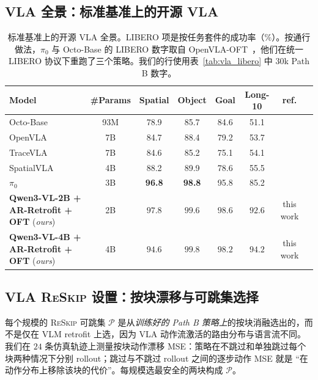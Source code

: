 \documentclass{article}
\newcommand{\reskip}{\textsc{ReSkip}}
\begin{document}
\subsection{VLA 全景：标准基准上的开源 VLA}
\label{app:vla_landscape}
\begin{table}[h]
\caption{标准基准上的开源 VLA 全景。LIBERO 项是按任务套件的成功率（$\%$）。按通行做法，$\pi_0$ 与 Octo-Base 的 LIBERO 数字取自 OpenVLA-OFT~\citep{kim2025openvlaoft}，他们在统一 LIBERO 协议下重跑了三个策略。我们的行使用表~\ref{tab:vla_libero} 中 $30$k Path B 数字。}
\label{tab:vla_landscape}
\centering\small
\setlength{\tabcolsep}{4pt}
\begin{tabular}{lccccccc}
\toprule
Model & \#Params & Spatial & Object & Goal & Long-10 & ref. \\
\midrule
Octo-Base    & 93M & 78.9 & 85.7 & 84.6 & 51.1 & \citep{team2024octo, kim2025openvlaoft} \\
OpenVLA      & 7B  & 84.7 & 88.4 & 79.2 & 53.7 & \citep{kim2024openvla, kim2025openvlaoft} \\
TraceVLA     & 7B  & 84.6 & 85.2 & 75.1 & 54.1 & \citep{zheng2024tracevla} \\
SpatialVLA   & 4B  & 88.2 & 89.9 & 78.6 & 55.5 & \citep{qu2025spatialvla} \\
$\pi_0$      & 3B  & \textbf{96.8} & \textbf{98.8} & 95.8 & 85.2 & \citep{black2024pi0, kim2025openvlaoft} \\
\midrule
\rowcolor{black!6}
\textbf{Qwen3-VL-2B + AR-Retrofit + OFT} (\emph{ours}) & 2B & $\mathbf{97.8}$ & $99.6$ & $\mathbf{98.6}$ & $92.6$ & this work \\
\rowcolor{black!6}
\textbf{Qwen3-VL-4B + AR-Retrofit + OFT} (\emph{ours}) & 4B & $94.6$ & $\mathbf{99.8}$ & $\mathbf{98.2}$ & $\mathbf{94.2}$ & this work \\
\bottomrule
\end{tabular}
\end{table}

\subsection{VLA \reskip{} 设置：按块漂移与可跳集选择}
\label{app:vla_pareto}

每个规模的 \reskip{} 可跳集 $\mathcal{P}$ 是从\emph{训练好的 Path B 策略上}的按块消融选出的，而不是仅在 VLM retrofit 上选，因为 VLA 动作流激活的路由分布与语言流不同。我们在 $24$ 条仿真轨迹上测量按块动作漂移 MSE：策略在不跳过和单独跳过每个块两种情况下分别 rollout；跳过与不跳过 rollout 之间的逐步动作 MSE 就是 ``在动作分布上移除该块的代价''。每规模选最安全的两块构成 $\mathcal{P}$。
\end{document}
